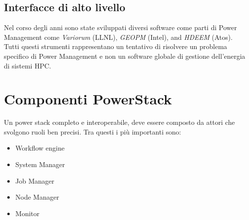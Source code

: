 \subsection{Interfacce di alto livello}


Nel corso degli anni sono state sviluppati diversi software come parti di Power Management come \emph{Variorum} (LLNL), \emph{GEOPM} (Intel)\cite{GEOPM}, and \emph{HDEEM} (Atos)\cite{HDEEM}. Tutti questi strumenti rappresentano un tentativo di risolvere un problema specifico di Power Management e non un software globale di gestione dell'energia di sistemi HPC.


\section{Componenti PowerStack}
Un power stack completo e interoperabile, deve essere composto da  attori che svolgono ruoli ben precisi. Tra questi i più importanti sono:
\begin{itemize}
    \item Workflow engine
    \item System Manager
    \item Job Manager
    \item Node Manager
    \item Monitor
\end{itemize}

